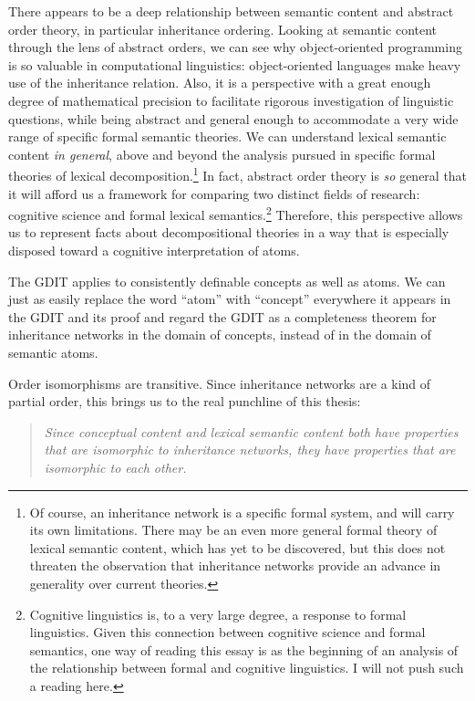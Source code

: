 There appears to be a deep relationship between semantic content and abstract order theory, in particular inheritance ordering. Looking at semantic content through the lens of abstract orders, we can see why object-oriented programming is so valuable in computational linguistics: object-oriented languages make heavy use of the inheritance relation. Also, it is a perspective with a great enough degree of mathematical precision to facilitate rigorous investigation of linguistic questions, while being abstract and general enough to accommodate a very wide range of specific formal semantic theories. We can understand lexical semantic content \emph{in general}, above and beyond the analysis pursued in specific formal theories of lexical decomposition.\footnote{Of course, an inheritance network is a specific formal system, and will carry its own limitations. There may be an even more general formal theory of lexical semantic content, which has yet to be discovered, but this does not threaten the observation that inheritance networks provide an advance in generality over current theories.}  In fact, abstract order theory is \emph{so} general that it will afford us a framework for comparing two distinct fields of research: cognitive science and formal lexical semantics.\footnote{Cognitive linguistics is, to a very large degree, a response to formal linguistics. Given this connection between cognitive science and formal semantics, one way of reading this essay is as the beginning of an analysis of the relationship between formal and cognitive linguistics. I will not push such a reading here.} Therefore, this perspective allows us to represent facts about decompositional theories in a way that is especially disposed toward a cognitive interpretation of atoms.

The GDIT applies to consistently definable concepts as well as atoms. We can just as easily replace the word ``atom'' with ``concept'' everywhere it appears in the GDIT and its proof and regard the GDIT as a completeness theorem for inheritance networks in the domain of concepts, instead of in the domain of semantic atoms.

Order isomorphisms are transitive. Since inheritance networks are a kind of partial order, this brings us to the real punchline of this thesis:
\begin{quote}
\emph{Since conceptual content and lexical semantic content both have properties that are isomorphic to inheritance networks, they have properties that are isomorphic to each other.}
\end{quote}

